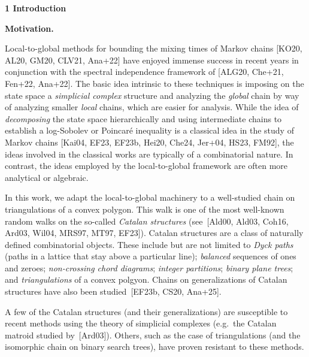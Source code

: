 

\par\medskip\noindent\textbf{1 Introduction}\par




\par\medskip\noindent\textbf{Motivation.}\par




Local-to-global methods for bounding the mixing times of Markov chains [KO20, AL20, GM20, CLV21, Ana+22] have enjoyed immense success in recent years in conjunction with the spectral independence framework of [ALG20, Che+21, Fen+22, Ana+22]. The basic idea intrinsic to these techniques is imposing on the state space a \emph{simplicial complex} structure and analyzing the \emph{global} chain by way of analyzing smaller \emph{local} chains, which are easier for analysis. While the idea of \emph{decomposing} the state space hierarchically and using intermediate chains to establish a log-Sobolev or Poincaré inequality is a classical idea in the study of Markov chains [Kai04, EF23, EF23b, Hei20, Che24, Jer+04, HS23, FM92], the ideas involved in the classical works are typically of a combinatorial nature. In contrast, the ideas employed by the local-to-global framework are often more analytical or algebraic.\par




In this work, we adapt the local-to-global machinery to a well-studied chain on triangulations of a convex polygon. This walk is one of the most well-known random walks on the so-called \emph{Catalan structures} (see [Ald00, Ald03, Coh16, Ard03, Wil04, MRS97, MT97, EF23]). Catalan structures are a class of naturally defined combinatorial objects. These include but are not limited to \emph{Dyck paths} (paths in a lattice that stay above a particular line); \emph{balanced} sequences of ones and zeroes; \emph{non-crossing chord diagrams}; \emph{integer partitions}; \emph{binary plane trees}; and \emph{triangulations} of a convex polgyon. Chains on generalizations of Catalan structures have also been studied [EF23b, CS20, Ana+25].\par




A few of the Catalan structures (and their generalizations) are susceptible to recent methods using the theory of simplicial complexes (e.g. the Catalan matroid studied by [Ard03]). Others, such as the case of triangulations (and the isomorphic chain on binary search trees), have proven resistant to these methods.\par




